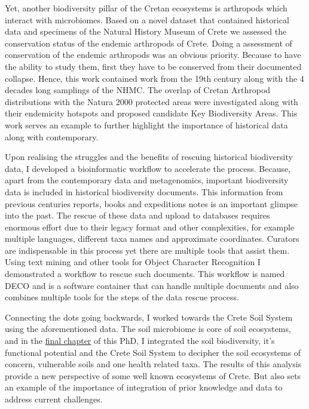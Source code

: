 \documentclass[
11pt, %
english, %
singlespacing, %
liststotoc, %
toctotoc, %
headsepline, %
]{MastersDoctoralThesis} %
\begin{document}
Yet, another biodiversity pillar of the Cretan ecosystems is arthropods which 
interact with microbiomes. Based on a novel dataset
that contained historical data and specimens of the Natural History Museum of Crete
we assessed the conservation status of the endemic arthropods of Crete. Doing a assessment of 
conservation of the endemic arthropods was an obvious priority. Because to have the ability to 
study them, first they have to be conserved from their documented collapse. Hence, this work contained 
work from the 19th century along with the 4 decades long samplings of the NHMC. 
The overlap of Cretan Arthropod distributions with the Natura 2000 protected areas
were investigated along with their endemicity hotspots and proposed candidate Key Biodiversity Areas.
This work serves an example to further highlight the importance of historical data along with contemporary.

Upon realising the struggles and the benefits of rescuing historical biodiversity data, I
developed a bioinformatic workflow to accelerate the process.
Because, apart from the contemporary data and metagenomics, important biodiversity data is 
included in historical biodiversity documents. This information from 
previous centuries reports, books and expeditions notes is an important glimpse into
the past. The rescue of these data and upload to databases requires enormous effort
due to their legacy format and other complexities, for example 
multiple languages, different taxa names and approximate coordinates.
Curators are indispensable in this process 
yet there are multiple tools that assist them. Using text mining and other tools 
for Object Character Recognition I demonstrated a workflow to rescue such documents.
This workflow is named DECO and is a software container that can handle multiple 
documents and also combines multiple tools for the steps of the data rescue process.

Connecting the dots going backwards, I worked towards the Crete Soil System using the aforementioned data.
The soil microbiome is core of soil ecosystems, and in the \hyperref[cha:crete-soil]{final chapter} of this PhD,
I integrated the soil biodiversity, it's functional potential and 
the Crete Soil System to decipher the soil ecosystems of concern, vulnerable soils and one health related taxa. The results 
of this analysis provide a new perspective of some well known ecosystems of Crete.
But also sets an example of the importance of integration of prior knowledge and data to address current challenges.
\end{document}
